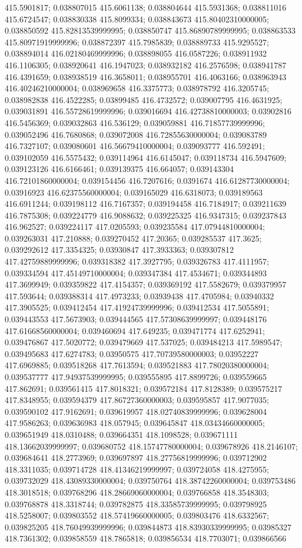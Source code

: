 415.5901817; 0.038807015 415.6061138; 0.038804644 415.5931368; 0.038811016 415.6724547; 0.038830338 415.8099334; 0.038843673 415.80402310000005; 0.038850592 415.82813539999995; 0.038850747 415.86890789999995; 0.038863533 415.80971919999996; 0.038872397 415.7985839; 0.038889733 415.9295527; 0.038894014 416.02180469999996; 0.038898055 416.0587226; 0.038911932 416.1106305; 0.038920641 416.1947023; 0.038932182 416.2576598; 0.038941787 416.4391659; 0.038938519 416.3658011; 0.038955701 416.4063166; 0.038963943 416.40246210000004; 0.038969658 416.3375773; 0.038978792 416.3205745; 0.038982838 416.4522285; 0.03899485 416.4732572; 0.039007795 416.4631925; 0.039031891 416.55728619999996; 0.039016694 416.42738810000003; 0.03902816 416.5456369; 0.039032863 416.536129; 0.039059881 416.71857739999996; 0.039052496 416.7680868; 0.039072008 416.72855630000004; 0.039083789 416.7327107; 0.039080601 416.56679410000004; 0.039093777 416.592491; 0.039102059 416.5575432; 0.039114964 416.6145047; 0.039118734 416.5947609; 0.039123126 416.6166461; 0.039139375 416.664057; 0.039143304 416.72101860000004; 0.039154456 416.7207616; 0.0391674 416.61287730000004; 0.03916923 416.62375560000004; 0.039165029 416.6318073; 0.039189563 416.6911244; 0.039198112 416.7167357; 0.039194458 416.7184917; 0.039211639 416.7875308; 0.039224779 416.9088632; 0.039225325 416.9347315; 0.039237843 416.962527; 0.039224117 417.0205593; 0.039235584 417.07944810000004; 0.039263031 417.210888; 0.039270452 417.20365; 0.039285537 417.3625; 0.039292612 417.3354325; 0.03930847 417.3933363; 0.039307812 417.42759889999996; 0.039318382 417.3927795; 0.039326783 417.4111957; 0.039334594 417.45149710000004; 0.039347384 417.4534671; 0.039344893 417.3699949; 0.039359822 417.4154357; 0.039369192 417.5582679; 0.039379957 417.593644; 0.039388314 417.4973233; 0.03939438 417.4705984; 0.03940332 417.3905525; 0.039412454 417.41924739999996; 0.039412534 417.5055891; 0.039443553 417.5673903; 0.039444565 417.57308639999997; 0.039448176 417.61668560000004; 0.039460694 417.649235; 0.039471774 417.6252941; 0.039476867 417.5020772; 0.039479669 417.537025; 0.039484213 417.5989547; 0.039495683 417.6274783; 0.03950575 417.70739580000003; 0.03952227 417.6969885; 0.039518268 417.7613594; 0.039521883 417.78020380000004; 0.039537777 417.94937539999995; 0.039555895 417.8899726; 0.039559665 417.862691; 0.039561415 417.8018321; 0.039572184 417.8128389; 0.039575217 417.8348955; 0.039594379 417.86727360000003; 0.039595857 417.9077035; 0.039590102 417.9162691; 0.039619957 418.02740839999996; 0.039628004 417.9586263; 0.039636983 418.057945; 0.039645847 418.03434660000005; 0.039651949 418.0310488; 0.039664351 418.1098528; 0.039671111 418.13662039999997; 0.039680752 418.15747780000004; 0.039678926 418.2146107; 0.039684641 418.2773969; 0.039697897 418.27756819999996; 0.039712902 418.3311035; 0.039714728 418.41346219999997; 0.039724058 418.4275955; 0.039732029 418.43089330000004; 0.039750764 418.38742260000004; 0.039753486 418.3018518; 0.039768296 418.28669060000004; 0.039766858 418.3548303; 0.039768878 418.3318744; 0.039782875 418.33585739999995; 0.039798925 418.5258007; 0.039803552 418.57419660000005; 0.039803476 418.6332567; 0.039825205 418.76049939999996; 0.039844873 418.83930339999995; 0.03985327 418.7361302; 0.039858559 418.7865818; 0.039856534 418.7703071; 0.039866566 